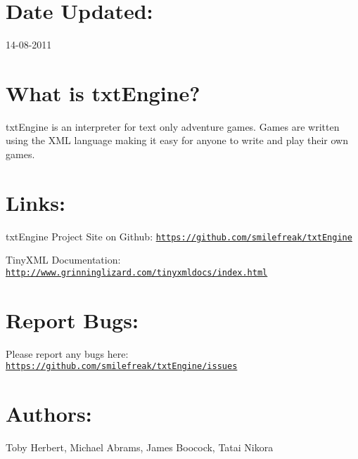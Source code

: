\hypertarget{index_date_sec}{}\section{\-Date Updated\-:}\label{index_date_sec}
14-\/08-\/2011\hypertarget{index_about_sec}{}\section{\-What is txt\-Engine?}\label{index_about_sec}
txt\-Engine is an interpreter for text only adventure games. \-Games are written using the \-X\-M\-L language making it easy for anyone to write and play their own games.\hypertarget{index_links_sec}{}\section{\-Links\-:}\label{index_links_sec}

\begin{DoxyItemize}
\item txt\-Engine \-Project \-Site on \-Github\-: \href{https://github.com/smilefreak/txtEngine}{\tt https\-://github.\-com/smilefreak/txt\-Engine}\par



\item \-Tiny\-X\-M\-L \-Documentation\-: \href{http://www.grinninglizard.com/tinyxmldocs/index.html}{\tt http\-://www.\-grinninglizard.\-com/tinyxmldocs/index.\-html}\par
 
\end{DoxyItemize}\hypertarget{index_bugs_sec}{}\section{\-Report Bugs\-:}\label{index_bugs_sec}
\-Please report any bugs here\-: \href{https://github.com/smilefreak/txtEngine/issues}{\tt https\-://github.\-com/smilefreak/txt\-Engine/issues}\par
\hypertarget{index_author_sec}{}\section{\-Authors\-:}\label{index_author_sec}
\-Toby \-Herbert, \-Michael \-Abrams, \-James \-Boocock, \-Tatai \-Nikora 